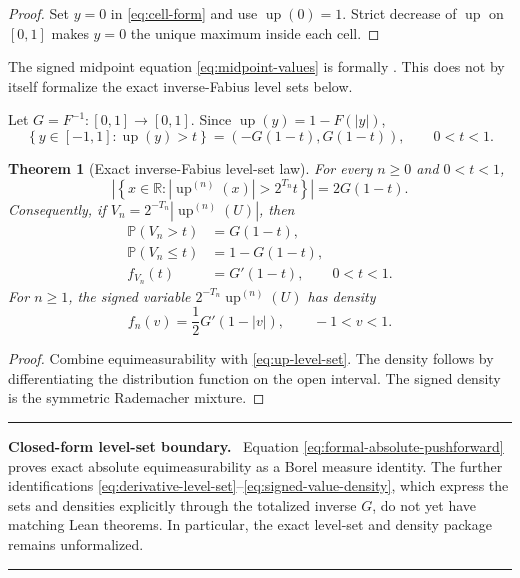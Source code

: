 \documentclass[11pt,oneside]{article}
\numberwithin{equation}{section}
\theoremstyle{plain}
\newtheorem{theorem}{Theorem}[section]
\theoremstyle{definition}
\theoremstyle{remark}
\newcommand{\R}{\mathbb R}
\newcommand{\Up}{\operatorname{up}}
\newcommand{\Prob}{\mathbb P}
\newcommand{\abs}[1]{\left|#1\right|}
\newcommand{\set}[1]{\left\{#1\right\}}
\newenvironment{statusbox}[1]{%
  \par\medskip\noindent\begin{minipage}{\textwidth}%
  \color{DeepBlue}\hrule\vspace{5pt}%
  \color{black}\textbf{\color{DeepBlue}#1.}\ }{%
  \par\vspace{5pt}\color{DeepBlue}\hrule
  \end{minipage}\par\medskip}
\begin{document}
\begin{proof}
Set $y=0$ in \eqref{eq:cell-form} and use $\Up(0)=1$.  Strict decrease of $\Up$ on
$[0,1]$ makes $y=0$ the unique maximum inside each cell.
\end{proof}

The signed midpoint equation \eqref{eq:midpoint-values} is formally
.  This does not by itself formalize the exact
inverse-Fabius level sets below.

Let $G=F^{-1}:[0,1]\to[0,1]$.  Since $\Up(y)=1-F(|y|)$,
\begin{equation}
 \set{y\in[-1,1]:\Up(y)>t}=(-G(1-t),G(1-t)),\qquad0<t<1.
 \label{eq:up-level-set}
\end{equation}

\begin{theorem}[Exact inverse-Fabius level-set law]
\label{thm:level-set-law}
For every $n\geq0$ and $0<t<1$,
\begin{equation}
 \boxed{
 \left|\set{x\in\R:
 \abs{\Up^{(n)}(x)}>2^{T_n}t}\right|
 =2G(1-t).}
 \label{eq:derivative-level-set}
\end{equation}
Consequently, if $V_n=2^{-T_n}\abs{\Up^{(n)}(U)}$, then
\begin{align}
 \Prob(V_n>t)&=G(1-t),\label{eq:V-tail}\\
 \Prob(V_n\leq t)&=1-G(1-t),\label{eq:V-cdf}\\
 f_{V_n}(t)&=G'(1-t),\qquad0<t<1.
 \label{eq:V-density}
\end{align}
For $n\geq1$, the signed variable $2^{-T_n}\Up^{(n)}(U)$ has density
\begin{equation}
 f_n(v)=\frac12G'(1-|v|),\qquad-1<v<1.
 \label{eq:signed-value-density}
\end{equation}
\end{theorem}

\begin{proof}
Combine equimeasurability with \eqref{eq:up-level-set}.  The density follows by
differentiating the distribution function on the open interval.  The signed density is the
symmetric Rademacher mixture.
\end{proof}

\begin{statusbox}{Closed-form level-set boundary}
Equation \eqref{eq:formal-absolute-pushforward} proves exact absolute equimeasurability as
a Borel measure identity.  The further identifications
\eqref{eq:derivative-level-set}--\eqref{eq:signed-value-density}, which express the sets
and densities explicitly through the totalized inverse \(G\), do not yet have matching Lean
theorems.  In particular, the exact level-set and density package remains unformalized.
\end{statusbox}
\end{document}
